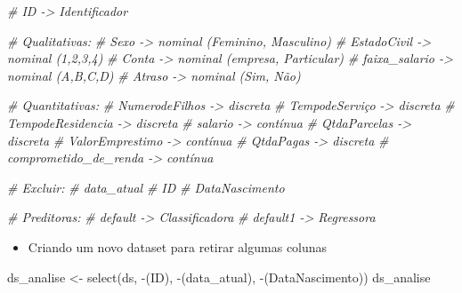\documentclass[
]{article}
\newenvironment{Shaded}{\begin{snugshade}}{\end{snugshade}}
\newcommand{\CommentTok}[1]{\textcolor[rgb]{0.56,0.35,0.01}{\textit{#1}}}
\newcommand{\FunctionTok}[1]{\textcolor[rgb]{0.00,0.00,0.00}{#1}}
\newcommand{\NormalTok}[1]{#1}
\newcommand{\OtherTok}[1]{\textcolor[rgb]{0.56,0.35,0.01}{#1}}
\newcommand{\SpecialCharTok}[1]{\textcolor[rgb]{0.00,0.00,0.00}{#1}}
\providecommand{\tightlist}{%
  \setlength{\itemsep}{0pt}\setlength{\parskip}{0pt}}
\begin{document}
\begin{Shaded}
\begin{Highlighting}[]
\CommentTok{\# ID {-}\textgreater{} Identificador}

\CommentTok{\# Qualitativas:}
\CommentTok{\# Sexo {-}\textgreater{} nominal (Feminino, Masculino) }
\CommentTok{\# EstadoCivil {-}\textgreater{} nominal (1,2,3,4) }
\CommentTok{\# Conta {-}\textgreater{} nominal (empresa, Particular) }
\CommentTok{\# faixa\_salario {-}\textgreater{} nominal (A,B,C,D) }
\CommentTok{\# Atraso {-}\textgreater{} nominal (Sim, Não) }

\CommentTok{\# Quantitativas:}
\CommentTok{\# NumerodeFilhos {-}\textgreater{} discreta}
\CommentTok{\# TempodeServiço {-}\textgreater{} discreta}
\CommentTok{\# TempodeResidencia {-}\textgreater{} discreta}
\CommentTok{\# salario {-}\textgreater{} contínua}
\CommentTok{\# QtdaParcelas {-}\textgreater{} discreta}
\CommentTok{\# ValorEmprestimo {-}\textgreater{} contínua}
\CommentTok{\# QtdaPagas {-}\textgreater{} discreta}
\CommentTok{\# comprometido\_de\_renda {-}\textgreater{} contínua}

\CommentTok{\# Excluir:}
\CommentTok{\# data\_atual}
\CommentTok{\# ID}
\CommentTok{\# DataNascimento}

\CommentTok{\# Preditoras:}
\CommentTok{\# default {-}\textgreater{} Classificadora}
\CommentTok{\# default1 {-}\textgreater{} Regressora}
\end{Highlighting}
\end{Shaded}

\begin{itemize}
\tightlist
\item
  Criando um novo dataset para retirar algumas colunas
\end{itemize}

\begin{Shaded}
\begin{Highlighting}[]
\NormalTok{ds\_analise }\OtherTok{\textless{}{-}} \FunctionTok{select}\NormalTok{(ds, }\SpecialCharTok{{-}}\NormalTok{(ID), }\SpecialCharTok{{-}}\NormalTok{(data\_atual), }\SpecialCharTok{{-}}\NormalTok{(DataNascimento))}
\NormalTok{ds\_analise}
\end{Highlighting}
\end{Shaded}
\end{document}
